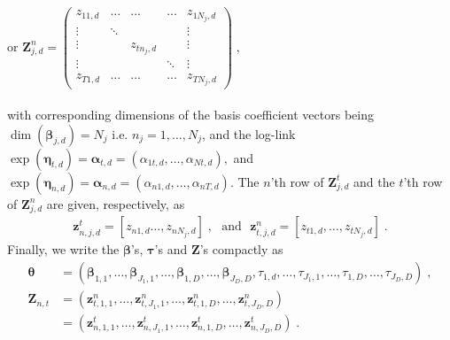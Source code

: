 \documentclass[a4paper,12pt]{scrartcl} %
\newcommand{\bs}{\boldsymbol}  %
\newcommand{\atd}{\bs{\alpha}_{t,d}}
\newcommand{\annd}{\bs{\alpha}_{n,d}}
\newcommand{\bjtd}{\bs{\beta}_{j,d}}
\newcommand{\ts}{\bs{\theta}}
\newcommand{\Zjtd}{\bs{Z}_{j,d}^{t}}
\newcommand{\Zjnd}{\bs{Z}_{j,d}^{n}}
\newcommand{\Znt}{\bs{Z}_{n,t}}
\begin{document}
or 
$\Zjnd=
\begin{pmatrix}
z_{11,d} & \ldots & \ldots & \ldots & z_{1N_j,d} \\ 
\vdots & \ddots &  &  & \vdots \\ 
\vdots &  & z_{tn_j,d} &  & \vdots \\ 
\vdots &  &  & \ddots & \vdots \\ 
z_{T1,d} & \ldots & \ldots & \ldots & z_{TN_j,d}
\end{pmatrix}\;,$ \\\\
with corresponding dimensions of the basis coefficient vectors being $\dim(\bjtd)=N_j$ i.e. $n_j=1,\ldots,N_j$, and the log-link  
$\exp(\bs{\eta}_{t,d}) =\atd =(\alpha_{1t,d},\ldots,\alpha_{Nt,d}),$ and $\exp(\bs{\eta}_{n,d}) =\annd =(\alpha_{n1,d},\ldots,\alpha_{nT,d})$. The $n$'th row of $\Zjtd$ and the $t$'th row of $\Zjnd$ are given, respectively, as
\begin{align*}
\bs{z}_{n,j,d}^{t}=[z_{n1,d}\ldots,z_{nN_j,d}]\;,~~~\text{and}~~~\bs{z}_{t,j,d}^{n}=[z_{t1,d},\ldots,z_{tN_j,d}]\;.
\end{align*}
Finally, we write the $\bs{\beta}$'s, $\bs{\tau}$'s and $\bs{Z}$'s compactly as
\begin{align*}
\ts&= \left(
\bs{\beta}_{1,1},\ldots,\bs{\beta}_{J_1,1},\ldots,
\bs{\beta}_{1,D},\ldots,\bs{\beta}_{J_D,D},
\tau_{1,d},\ldots,\tau_{J_1,1},\ldots,
\tau_{1,D},\ldots,\tau_{J_D,D}
\right)\;, \\
\Znt &= \left(
\bs{z}_{t,1,1}^{n},\ldots,\bs{z}_{t,J_1,1}^{n},\ldots,
\bs{z}_{t,1,D}^{n},\ldots,\bs{z}_{t,J_D,D}^{n}
\right)\\
&=\left(
\bs{z}_{n,1,1}^{t},\ldots,\bs{z}_{n,J_1,1}^{t},\ldots,
\bs{z}_{n,1,D}^{t},\ldots,\bs{z}_{n,J_D,D}^{t}
\right)\;.
\end{align*}
\clearpage
%
%
%
%
%
\end{document}
